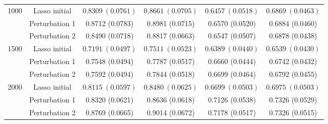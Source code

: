 \documentclass[12pt]{article}
\begin{document}
\begin{table}[!ht]
\begin{tabular}{cccccc}
        \hline
        \multirow{3}{*}{1000} 
        & Lasso initial & $0.8309\ (0.0761)$  & $0.8661\ (0.0705)$ & $0.6457\ (0.0518)$ & $0.6869\ (0.0463)$ \\ 
        & Perturbation 1  & 0.8712 (0.0783)  & 0.8981 (0.0715) & 0.6570 (0.0520) & 0.6884 (0.0460) \\
        & Perturbation 2  & 0.8490 (0.0718) & 0.8817 (0.0663) & 0.6547 (0.0507) & 0.6878 (0.0438) \\
        \hline
        \multirow{3}{*}{1500} 
        & Lasso initial & $0.7191\ (0.0497)$  & $0.7511\ (0.0523) $ & $0.6389\ (0.0440)$ & $0.6539\ (0.0430)$ \\ 
        & Perturbation 1  & 0.7548 (0.0494) & 0.7787 (0.0517) & 0.6660 (0.0444) & 0.6742 (0.0432) \\
        & Perturbation 2  & 0.7592 (0.0494) & 0.7844 (0.0518)& 0.6699 (0.0464) & 0.6792 (0.0455) \\
        \hline
        \multirow{3}{*}{2000} 
        & Lasso initial & $0.8115\ (0.0597)$  & $0.8480\ (0.0625)$ & $0.6699\ (0.0503)$ & $0.6975\ (0.0503)$ \\ 
        & Perturbation 1 & 0.8320 (0.0621) & 0.8636 (0.0618)& 0.7126 (0.0538) & 0.7326 (0.0529) \\
        & Perturbation 2  & 0.8769 (0.0665) & 0.9014 (0.0672) & 0.7178 (0.0517) & 0.7326 (0.0515) \\
        \bottomrule
    \end{tabular}
\end{table}
\end{document}
